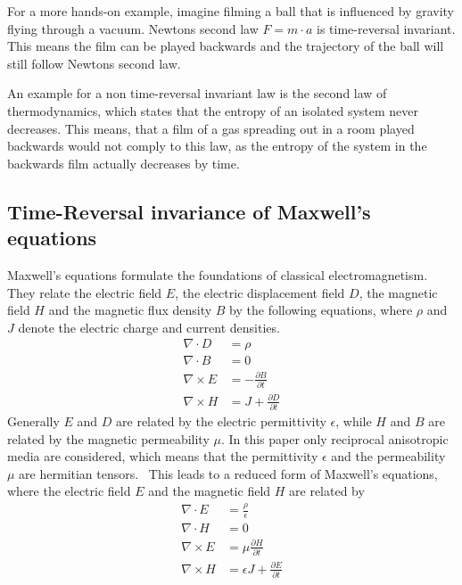 For a more hands-on example, imagine filming a ball that is influenced by gravity flying through a vacuum.
Newtons second law \({F}=m \cdot {a}\) is time-reversal invariant. This means the film can be played backwards and the trajectory of the ball will still follow Newtons second law.

An example for a non time-reversal invariant law is the second law of thermodynamics, which states that the entropy of an isolated system never decreases.
This means, that a film of a gas spreading out in a room played backwards would not comply to this law, as the entropy of the system in the backwards film actually decreases by time.



\subsection{Time-Reversal invariance of Maxwell's equations}
Maxwell's equations formulate the foundations of classical electromagnetism.
They relate the electric field \(E\), the electric displacement field \(D\), the magnetic field \(H\) and the magnetic flux density \(B\)  by the following equations, where \(\rho \) and \({J}\) denote the electric charge and current densities.
\begin{align}\label{eq:maxwell}
    \nabla \cdot D &= \rho \\
    \nabla \cdot B &= 0 \\
    \nabla \times E &= -\frac{\partial B}{\partial t} \\
    \nabla \times H &= J + \frac{\partial D}{\partial t}
\end{align}
Generally \(E\) and \(D\) are related by the electric permittivity \(\epsilon \), while \(H\) and \(B\) are related by the magnetic permeability \(\mu \).
In this paper only reciprocal anisotropic media are considered, which means that the permittivity \(\epsilon \) and the permeability \(\mu \) are hermitian tensors.~\parencite{krowne_electromagnetic_1984}
This leads to a reduced form of Maxwell's equations, where the electric field \(E\) and the magnetic field \(H\) are related by
\begin{align}\label{eq:maxwell_reciprocal}
    \nabla \cdot E &= \frac{\rho}{\epsilon} \\
    \nabla \cdot H &= 0 \\
    \nabla \times E &= \mu \frac{\partial H}{\partial t} \\
    \nabla \times H &= \epsilon {J} + \frac{\partial E}{\partial t}
\end{align}

